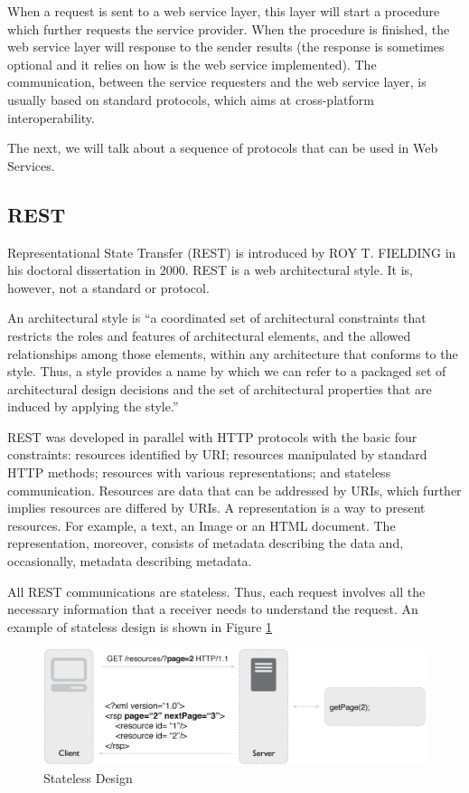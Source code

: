 When a request is sent to a web service layer, this layer will start a procedure which further requests the service provider. When the procedure is finished, the web service layer will response to the sender results (the response is sometimes optional and it relies on how is the web service implemented). The communication, between the service requesters and the web service layer, is usually based on standard protocols, which aims at cross-platform interoperability. 

The next, we will talk about a sequence of protocols that can be used in Web Services.

\subsection{REST}
Representational State Transfer (REST) is introduced by ROY T. FIELDING in his doctoral dissertation in 2000. REST is a web architectural style. It is, however, not a standard or protocol. 

An architectural style is ``a coordinated set of architectural constraints that restricts the roles and features of architectural elements, and the allowed relationships among those elements, within any architecture that conforms to the style. Thus, a style provides a name by which we can refer to a packaged set of architectural design decisions and the set of architectural properties that are induced by applying the style.'' \cite {fielding2002principled}

REST was developed in parallel with HTTP protocols with the basic four constraints: resources identified by URI; resources manipulated by standard HTTP methods; resources with various representations; and stateless communication. Resources are data that can be addressed by URIs, which further implies resources are differed by URIs. A representation is a way to present resources. For example, a text, an Image or an HTML document. The representation, moreover, consists of metadata describing the data and, occasionally, metadata describing metadata.

All REST communications are stateless. Thus, each request involves all the necessary information that a receiver needs to understand the request. An example of stateless design is shown in Figure \ref{fig:stateless-design} \cite{rodriguez2008restful}

\begin{figure}[ht]
  \begin{center}
    \includegraphics[width=1\textwidth]{images/stateless-design.pdf}
    \caption{Stateless Design}
    \label{fig:stateless-design}
  \end{center}
\end{figure}

